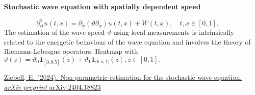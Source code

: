 {\myfontsize
        \linespread{0.7}
        \begin{center}
            \textbf{Stochastic wave equation with spatially dependent speed}
        \end{center}
        \begin{equation*}
        \partial_{tt}^{2}{u}(t,x)=\partial_x(\vartheta\partial_x)u(t,x) + \dot{W}(t,x), \quad t, x \in [0,1].
        \end{equation*}
        The estimation of the wave speed $\vartheta$ using local measurements is intrinsically related to the energetic behaviour of the wave equation and involves the theory of Riemann-Lebesgue operators. Heatmap with $\vartheta(z)= \vartheta_0 \mathbf{1}_{[0,0.5]}(z)+ \vartheta_1 \mathbf{1}_{(0.5,1]}(z),z \in [0,1].$\\ \par}
        {\fontsize{12}{4}\selectfont \href{https://arxiv.org/abs/2404.18823}{Ziebell, E. (2024). Non-parametric estimation for the stochastic wave equation. \textit{arXiv preprint} arXiv:2404.18823}
        \par
        }
